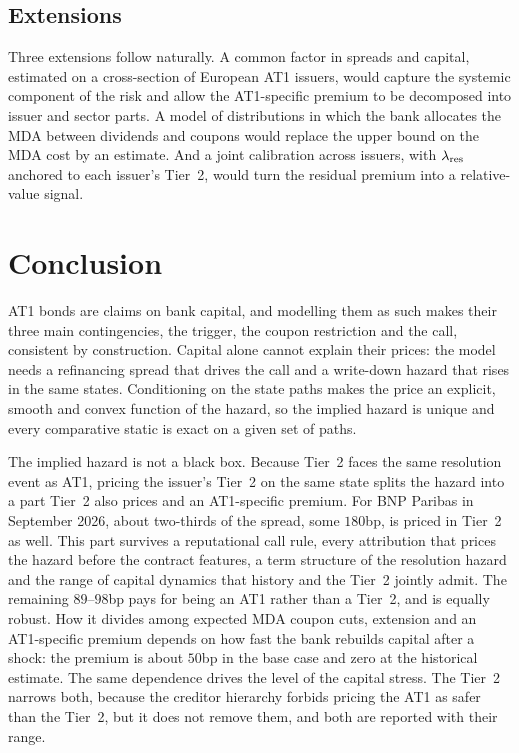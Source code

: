 \subsection{Extensions}

Three extensions follow naturally. A common factor in spreads and capital, estimated on a
cross-section of European AT1 issuers, would capture the systemic component of the risk and
allow the AT1-specific premium to be decomposed into issuer and sector parts. A model of
distributions in which the bank allocates the MDA between dividends and coupons would
replace the upper bound on the MDA cost by an estimate. And a joint calibration across
issuers, with $\lambda_{\mathrm{res}}$ anchored to each issuer's Tier~2, would turn the residual premium into a
relative-value signal.

\section{Conclusion}\label{sec:conclusion}

AT1 bonds are claims on bank capital, and modelling them as such makes their three main
contingencies, the trigger, the coupon restriction and the call, consistent by construction.
Capital alone cannot explain their prices: the model needs a refinancing spread that drives
the call and a write-down hazard that rises in the same states. Conditioning on the state
paths makes the price an explicit, smooth and convex function of the hazard, so the implied
hazard is unique and every comparative static is exact on a given set of paths.

The implied hazard is not a black box. Because Tier~2 faces the same resolution event as AT1,
pricing the issuer's Tier~2 on the same state splits the hazard into a part Tier~2 also
prices and an AT1-specific premium. For BNP Paribas in September 2026, about two-thirds of
the spread, some $180$bp, is priced in Tier~2 as well. This part survives a reputational
call rule, every attribution that prices the hazard before the contract features, a term
structure of the resolution hazard and the range of capital dynamics that history and the
Tier~2 jointly admit. The remaining $89$--$98$bp pays for being an AT1 rather than a Tier~2, and is
equally robust. How it divides among expected MDA coupon cuts, extension and an
AT1-specific premium depends on how fast the bank rebuilds capital after a shock: the
premium is about $50$bp in the base case and zero at the historical estimate. The same dependence drives the level of the capital
stress. The Tier~2 narrows both, because the creditor hierarchy forbids pricing the AT1 as
safer than the Tier~2, but it does not remove them, and both are reported with their
range.